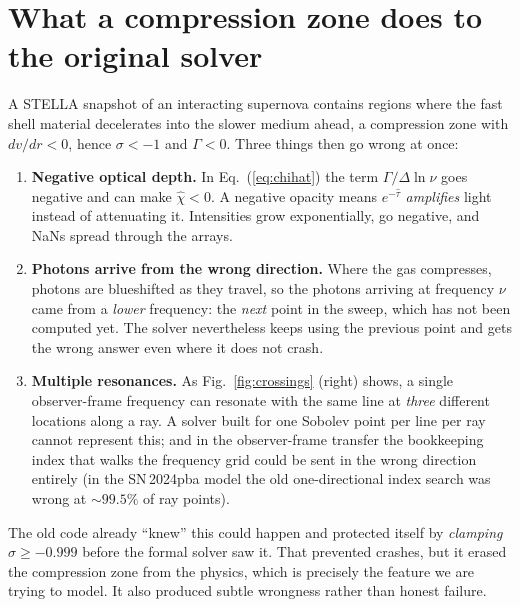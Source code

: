 \documentclass[11pt,a4paper]{article}
\begin{document}
\section{What a compression zone does to the original solver}
\label{sec:breaks}

A STELLA snapshot of an interacting supernova contains regions where the
fast shell material decelerates into the slower medium ahead, a
compression zone with $dv/dr < 0$, hence $\sigma < -1$ and $\Gamma < 0$.
Three things then go wrong at once:

\begin{enumerate}[nosep]
  \item \textbf{Negative optical depth.}  In Eq.~(\ref{eq:chihat}) the
        term $\Gamma/\Delta\ln\nu$ goes negative and can make
        $\hat\chi < 0$.  A negative opacity means $e^{-\hat\tau}$
        \emph{amplifies} light instead of attenuating it.  Intensities
        grow exponentially, go negative, and NaNs spread through the
        arrays.
  \item \textbf{Photons arrive from the wrong direction.}  Where the gas
        compresses, photons are blueshifted as they travel, so the
        photons arriving at frequency $\nu$ came from a \emph{lower}
        frequency: the \emph{next} point in the sweep, which has
        not been computed yet.  The solver nevertheless keeps using the
        previous point and gets the wrong answer even where it does not
        crash.
  \item \textbf{Multiple resonances.}  As Fig.~\ref{fig:crossings}
        (right) shows, a single observer-frame frequency can resonate
        with the same line at \emph{three} different locations along a
        ray.  A solver built for one Sobolev point per line per ray
        cannot represent this; and in the observer-frame transfer the
        bookkeeping index that walks the frequency grid could be sent
        in the wrong direction entirely (in the SN\,2024pba model the
        old one-directional index search was wrong at
        ${\sim}99.5\%$ of ray points).
\end{enumerate}

The old code already ``knew'' this could happen and protected itself by
\emph{clamping} $\sigma \ge -0.999$ before the formal solver saw it.
That prevented crashes, but it erased the compression zone from the
physics, which is precisely the feature we are trying to model.  It also
produced subtle wrongness rather than honest failure.
\end{document}
